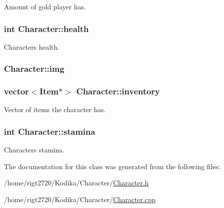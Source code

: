 Amount of gold player has. 

\hypertarget{classCharacter_a69c649b8febd22729e6edafb27e69aeb}{
\subsubsection[{health}]{\setlength{\rightskip}{0pt plus 5cm}int Character\-::health\hspace{0.3cm}{\ttfamily [protected]}}}\label{classCharacter_a69c649b8febd22729e6edafb27e69aeb}


Characters health. 

\hypertarget{classCharacter_a3a0a90b2a43858b259912f659b8e0eea}{
\subsubsection[{img}]{ Character\-::img\hspace{0.3cm}{\ttfamily [protected]}}}\label{classCharacter_a3a0a90b2a43858b259912f659b8e0eea}
\hypertarget{classCharacter_ade4db4a453cc96bedbf3a385a10291fa}{
\subsubsection[{inventory}]{\setlength{\rightskip}{0pt plus 5cm}vector$<${\bf Item}$\ast$$>$ Character\-::inventory\hspace{0.3cm}{\ttfamily [protected]}}}\label{classCharacter_ade4db4a453cc96bedbf3a385a10291fa}


Vector of items the character has. 

\hypertarget{classCharacter_a0f17daa14530e07f0ca479c2dd97f38b}{
\subsubsection[{stamina}]{\setlength{\rightskip}{0pt plus 5cm}int Character\-::stamina\hspace{0.3cm}{\ttfamily [protected]}}}\label{classCharacter_a0f17daa14530e07f0ca479c2dd97f38b}


Characters stamina. 



The documentation for this class was generated from the following files\-:\begin{DoxyCompactItemize}
\item 
/home/rigt2720/\-Kodika/\-Character/\hyperlink{Character_8h}{Character.\-h}\item 
/home/rigt2720/\-Kodika/\-Character/\hyperlink{Character_8cpp}{Character.\-cpp}\end{DoxyCompactItemize}

